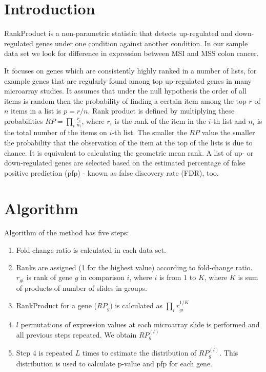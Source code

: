 \documentclass[a4paper]{report}
\begin{document}
\section*{Introduction}
RankProduct is a non-parametric statistic that detects up-regulated and down-regulated genes under one condition against another condition. In our sample data set we look for difference in expression between MSI and MSS colon cancer. \par
It focuses on genes which are consistently highly ranked in a number of lists, for example genes that are regularly found among top up-regulated genes in many microarray studies. It assumes that under the null hypothesis the order of all items is random then the probability of finding a certain item among the top $r$ of $n$ items in a list is $p=r/n$. Rank product is defined by multiplying these probabilities $RP=\prod_{i}\frac{r_i}{n_i}$, where $r_i$ is the rank of the item in the $i$-th list and $n_i$ is the total number of the items on $i$-th list. The smaller the $RP$ value the smaller the probability that the observation of the item at the top of the lists is due to chance. It is equivalent to calculating the geometric mean rank. A list of up- or down-regulated genes are selected based on the estimated percentage of false positive prediction (pfp) - known as false discovery rate (FDR), too.
\section*{Algorithm}
Algorithm of the method has five steps:
\begin{enumerate}
\item Fold-change ratio is calculated in each data set.
\item Ranks are assigned (1 for the highest value) according to fold-change ratio. $r_{gi}$ is rank of gene $g$ in comparison $i$, where $i$ is from $1$ to $K$, where $K$ is sum of products of number of slides in groups.
\item RankProduct for a gene ($RP_g$) is calculated as $\prod_{i}r_{gi}^{1/K}$
\item $l$ permutations of expression values at each microarray slide is performed and all previous steps repeated. We obtain $RP_g^{(l)}$
\item Step 4 is repeated $L$ times to estimate the distribution of $RP_g^{(l)}$. This distribution is used to calculate p-value and pfp for each gene.
\end{enumerate}
\end{document}
